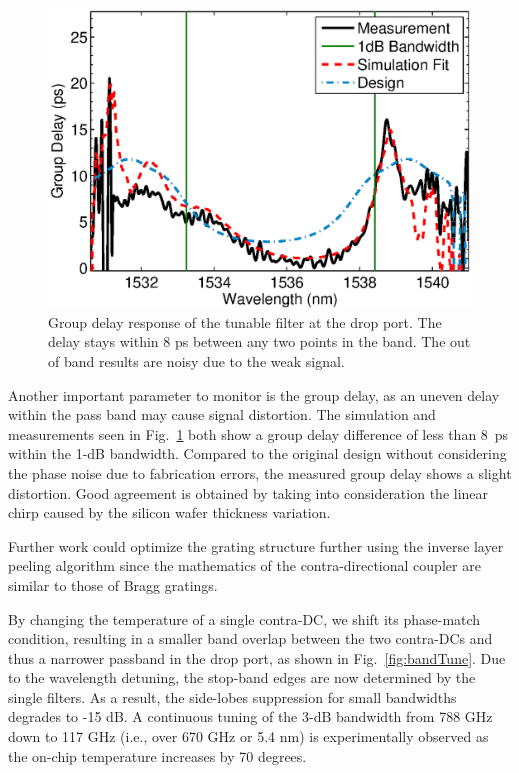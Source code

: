 \documentclass[9pt,twocolumn,twoside]{osajnl}
\begin{document}
	\begin{figure}[tbp]
		\centering
		\includegraphics[width=.99\columnwidth]{data/Phase3}
		\caption{ Group delay response of the tunable filter at the drop port. The delay stays within 8 ps between any two points in the band. The out of band results are noisy due to the weak signal.}
		\label{fig:phase}
	\end{figure}
	Another important parameter to monitor is the group delay, as an uneven delay within the pass band may cause signal distortion. The simulation and measurements seen in Fig.~\ref{fig:phase} both show a group delay difference of less than 8~ps within the 1-dB bandwidth. 
	Compared to the original design without considering the phase noise due to fabrication errors, the measured group delay shows a slight distortion. Good agreement is obtained by taking into consideration the linear chirp caused by the silicon wafer thickness variation.
	
	Further work could optimize the grating structure further using the inverse layer peeling algorithm\cite{skaar2001synthesis} since the mathematics of the contra-directional coupler are similar to those of Bragg gratings.
	
	By changing the temperature of a single contra-DC, we shift its phase-match condition, resulting in a smaller band overlap between the two contra-DCs and thus a narrower passband in the drop port, as shown in Fig.~\ref{fig:bandTune}.  
	Due to the wavelength detuning,  the stop-band edges are now determined by the single filters. 
	As a result, the side-lobes suppression for small bandwidths degrades to -15 dB.
	A continuous tuning of the 3-dB bandwidth from 788 GHz down to 117 GHz (i.e., over 670 GHz or 5.4 nm) is experimentally observed as the on-chip temperature increases by 70 degrees. 
	
\end{document}
